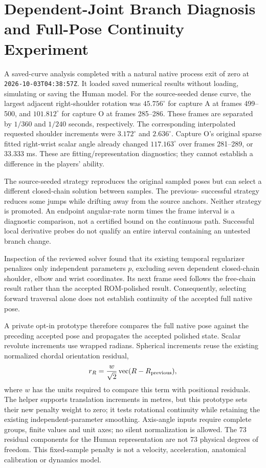 \documentclass[11pt,a4paper]{article}
\begin{document}
\section{Dependent-Joint Branch Diagnosis and Full-Pose Continuity Experiment}
\label{sec:full-pose-continuity-experiment}
A saved-curve analysis completed with a natural native process exit of zero
at \texttt{2026-10-03T04:38:57Z}. It loaded saved numerical results without
loading, simulating or saving the Human model. For the source-seeded dense
curve, the largest adjacent right-shoulder rotation was $45.756^{\circ}$ for
capture A at frames 499--500, and $101.812^{\circ}$ for capture O at frames
285--286. These frames are separated by $1/360$ and $1/240$ seconds,
respectively. The corresponding interpolated requested shoulder increments
were $3.172^{\circ}$ and $2.636^{\circ}$. Capture O's original sparse fitted
right-wrist scalar angle already changed $117.163^{\circ}$ over frames
281--289, or $33.333$ ms. These are fitting/representation diagnostics;
they cannot establish a difference in the players' ability.

The source-seeded strategy reproduces the original sampled poses but can
select a different closed-chain solution between samples. The previous-
successful strategy reduces some jumps while drifting away from the source
anchors. Neither strategy is promoted. An endpoint angular-rate norm times
the frame interval is a diagnostic comparison, not a certified bound on the
continuous path. Successful local derivative probes do not qualify an
entire interval containing an untested branch change.

Inspection of the reviewed solver found that its existing temporal
regularizer penalizes only independent parameters $p$, excluding seven
dependent closed-chain shoulder, elbow and wrist coordinates. Its next
frame seed follows the free-chain result rather than the accepted
ROM-polished result. Consequently, selecting forward traversal alone does
not establish continuity of the accepted full native pose.

A private opt-in prototype therefore compares the full native pose against
the preceding accepted pose and propagates the accepted polished state.
Scalar revolute increments use wrapped radians. Spherical increments reuse
the existing normalized chordal orientation residual,
\[
 r_R=\frac{w}{\sqrt{2}}\operatorname{vec}(R-R_{\rm previous}),
\]
where $w$ has the units required to compare this term with positional
residuals. The helper supports translation increments in metres, but this prototype sets their new penalty weight to zero; it tests rotational continuity while retaining the existing independent-parameter smoothing. Axis-angle inputs require
complete groups, finite values and unit axes; no silent normalization is
allowed. The 73 residual components for the Human representation are not
73 physical degrees of freedom. This fixed-sample penalty is not a
velocity, acceleration, anatomical calibration or dynamics model.
\end{document}
